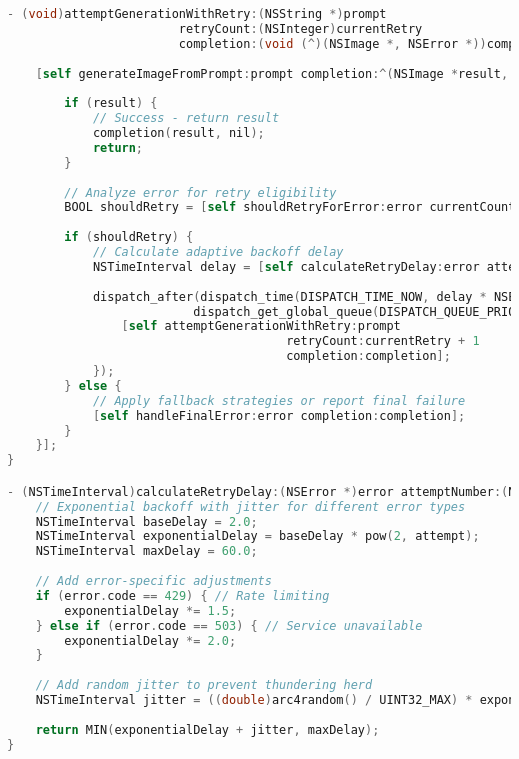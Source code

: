 \begin{lstlisting}[language=C,basicstyle=\footnotesize\ttfamily,frame=single,breaklines=true,columns=flexible,caption={Adaptive Retry Logic Implementation},label={lst:retry_logic}]
- (void)attemptGenerationWithRetry:(NSString *)prompt 
                        retryCount:(NSInteger)currentRetry
                        completion:(void (^)(NSImage *, NSError *))completion {
    
    [self generateImageFromPrompt:prompt completion:^(NSImage *result, NSError *error) {
        
        if (result) {
            // Success - return result
            completion(result, nil);
            return;
        }
        
        // Analyze error for retry eligibility
        BOOL shouldRetry = [self shouldRetryForError:error currentCount:currentRetry];
        
        if (shouldRetry) {
            // Calculate adaptive backoff delay
            NSTimeInterval delay = [self calculateRetryDelay:error attemptNumber:currentRetry];
            
            dispatch_after(dispatch_time(DISPATCH_TIME_NOW, delay * NSEC_PER_SEC),
                          dispatch_get_global_queue(DISPATCH_QUEUE_PRIORITY_DEFAULT, 0), ^{
                [self attemptGenerationWithRetry:prompt 
                                       retryCount:currentRetry + 1 
                                       completion:completion];
            });
        } else {
            // Apply fallback strategies or report final failure
            [self handleFinalError:error completion:completion];
        }
    }];
}

- (NSTimeInterval)calculateRetryDelay:(NSError *)error attemptNumber:(NSInteger)attempt {
    // Exponential backoff with jitter for different error types
    NSTimeInterval baseDelay = 2.0;
    NSTimeInterval exponentialDelay = baseDelay * pow(2, attempt);
    NSTimeInterval maxDelay = 60.0;
    
    // Add error-specific adjustments
    if (error.code == 429) { // Rate limiting
        exponentialDelay *= 1.5;
    } else if (error.code == 503) { // Service unavailable
        exponentialDelay *= 2.0;
    }
    
    // Add random jitter to prevent thundering herd
    NSTimeInterval jitter = ((double)arc4random() / UINT32_MAX) * exponentialDelay * 0.1;
    
    return MIN(exponentialDelay + jitter, maxDelay);
}
\end{lstlisting}

